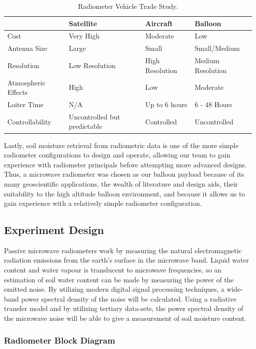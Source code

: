 \documentclass[12pt]{article}
\begin{document}
\begin{table}[!h]
	\centering
	\vspace{0.5cm}
	\renewcommand{\arraystretch}{1.3}
	\caption{Radiometer Vehicle Trade Study. }
	\label{tab:vehicle_trade}
	\begin{tabularx}{\textwidth}{llll}
		\toprule
						& Satellite & Aircraft & Balloon \\		
		\midrule
		Cost					&Very High&Moderate&Low \\ 
		Antenna Size 			&Large&Small&Small/Medium \\
		Resolution 				&Low Resolution&High Resolution&Medium Resolution \\ 
		Atmospheric Effects		&High&Low&Moderate \\ 
		Loiter Time				&N/A&Up to 6 hours&6 - 48 Hours \\ 
		Controllability			&Uncontrolled but predictable&Controlled&Uncontrolled 
	\end{tabularx}
\end{table}

Lastly, soil moisture retrieval from radiometric data is one of the more simple radiometer configurations to design and operate, allowing our team to gain experience with radiometer principals before attempting more advanced designs. Thus, a microwave radiometer was chosen as our balloon payload because of its many geoscientific applications, the wealth of literature and design aids, their suitability to the high altitude balloon environment, and because it allows us to gain experience with a relatively simple radiometer configuration.
 
\subsection{Experiment Design}

Passive microwave radiometers work by measuring the natural electromagnetic radiation emissions from the earth's surface in the microwave band. Liquid water content and water vapour is translucent to microwave frequencies, so an estimation of soil water content can be made by measuring the power of the emitted noise. By utilizing modern digital signal processing techniques, a wide-band power spectral density of the noise will be calculated. Using a radiative transfer model and by utilizing tertiary data-sets, the power spectral density of the microwave noise will be able to give a measurement of soil moisture content.

\subsubsection{Radiometer Block Diagram}
\end{document}
